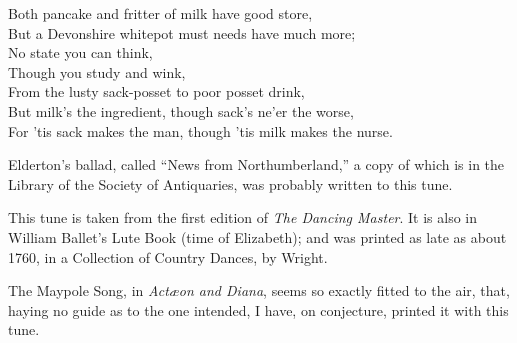\begin{scverse}
\begin{patverse}
Both pancake and fritter of milk have good store,\\
But a Devonshire whitepot must needs have much more;\\
No state you can think,\\
Though you study and wink,\\
From the lusty sack-posset to poor posset drink,\\
But milk’s the ingredient, though sack’s ne’er the worse,\\
For 'tis sack makes the man, though 'tis milk makes the nurse.
\end{patverse}
\end{scverse}

Elderton’s ballad, called “News from Northumberland,” a copy of which is in
the Library of the Society of Antiquaries, was probably written to this tune.


This tune is taken from the first edition of \textit{The Dancing Master}.	It is also in
William Ballet’s Lute Book (time of Elizabeth); and was printed as late as about
1760, in a Collection of Country Dances, by Wright.

The Maypole Song, in \textit{Actæon and Diana}, seems so exactly fitted to the air,
that, haying no guide as to the one intended, I have, on conjecture, printed it
with this tune.
\pagebreak

\medskip


